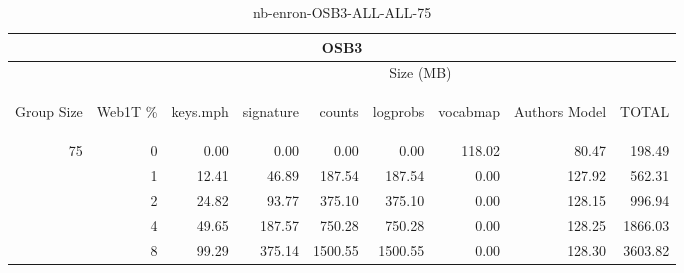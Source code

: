 \begin{center}
\begin{table}[htbp]
\begin{tabular}{ | r | r | r | r | r | r | r | r | r |}
\hline
\multicolumn{9}{|c|}{OSB3}\\
\hline
 & & \multicolumn{7}{|c|}{Size (MB)}\\ \cline{3-9}
\begin{sideways}Group Size\end{sideways} & \begin{sideways}Web1T \% \end{sideways} & \begin{sideways}keys.mph\end{sideways} & \begin{sideways}signature\end{sideways} & \begin{sideways}counts\end{sideways} & \begin{sideways}logprobs\end{sideways} & \begin{sideways}vocabmap\end{sideways} & \begin{sideways}Authors Model \end{sideways} & \begin{sideways}TOTAL\end{sideways}\\
\hline
\multirow{4}{*}{75}
 & 0 & 0.00 & 0.00 & 0.00 & 0.00 & 118.02 & 80.47 & 198.49\\ \cline{2-9}
 & 1 & 12.41 & 46.89 & 187.54 & 187.54 & 0.00 & 127.92 & 562.31\\ \cline{2-9}
 & 2 & 24.82 & 93.77 & 375.10 & 375.10 & 0.00 & 128.15 & 996.94\\ \cline{2-9}
 & 4 & 49.65 & 187.57 & 750.28 & 750.28 & 0.00 & 128.25 & 1866.03\\ \cline{2-9}
 & 8 & 99.29 & 375.14 & 1500.55 & 1500.55 & 0.00 & 128.30 & 3603.82\\ \cline{2-9}
\hline
\end{tabular}
\caption{nb-enron-OSB3-ALL-ALL-75}
\label{table:nb-enron-OSB3-ALL-ALL-75}
\end{table}
\end{center}

